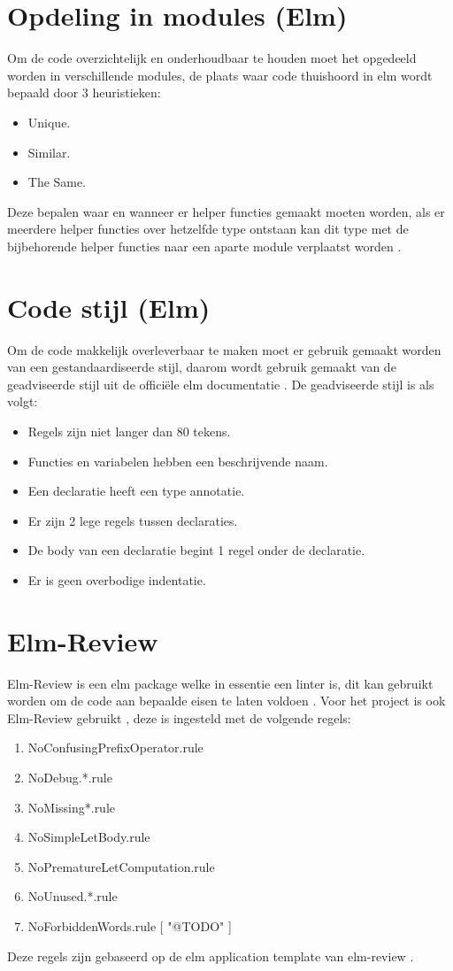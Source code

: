 \documentclass[12pt, a4paper]{report}
\begin{document}
    \section{Opdeling in modules (Elm)}
    Om de code overzichtelijk en onderhoudbaar te houden moet het opgedeeld worden in verschillende modules,
    de plaats waar code thuishoord in elm wordt bepaald door 3 heuristieken:
    \begin{itemize}
        \item Unique.
        \item Similar.
        \item The Same.
    \end{itemize}
    Deze bepalen waar en wanneer er helper functies gemaakt moeten worden,
    als er meerdere helper functies over hetzelfde type ontstaan kan dit type met de bijbehorende helper functies naar een aparte module verplaatst worden \cite{elm-modules}.
    \section{Code stijl (Elm)}
    Om de code makkelijk overleverbaar te maken moet er gebruik gemaakt worden van een gestandaardiseerde stijl,
    daarom wordt gebruik gemaakt van de geadviseerde stijl uit de officiële elm documentatie \cite{elm-style}.
    De geadviseerde stijl is als volgt:
    \begin{itemize}
        \item Regels zijn niet langer dan 80 tekens.
        \item Functies en variabelen hebben een beschrijvende naam.
        \item Een declaratie heeft een type annotatie.
        \item Er zijn 2 lege regels tussen declaraties.
        \item De body van een declaratie begint 1 regel onder de declaratie.
        \item Er is geen overbodige indentatie.
    \end{itemize}
    \section{Elm-Review}
    Elm-Review is een elm package welke in essentie een linter is,
    dit kan gebruikt worden om de code aan bepaalde eisen te laten voldoen \cite{elm-review}.
    Voor het project is ook Elm-Review gebruikt \cite{proj-elm-review},
    deze is ingesteld met de volgende regels:
    \begin{enumerate}
        \item NoConfusingPrefixOperator.rule
        \item NoDebug.*.rule
        \item NoMissing*.rule
        \item NoSimpleLetBody.rule
        \item NoPrematureLetComputation.rule
        \item NoUnused.*.rule
        \item NoForbiddenWords.rule [ "@TODO" ]
    \end{enumerate}
    Deze regels zijn gebaseerd op de elm application template van elm-review \cite{elm-review-template}.

    \newpage
    \nocite{*}
    \printbibliography
\end{document}
